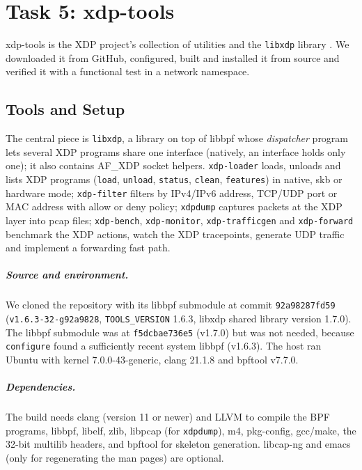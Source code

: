 \chapter{Task 5: xdp-tools}\label{ch:task5}

xdp-tools is the XDP project's collection of utilities and the \texttt{libxdp} library \autocite{xdptools_github}. We downloaded it from GitHub, configured, built and installed it from source and verified it with a functional test in a network namespace.

\section{Tools and Setup}\label{sec:t5-setup}

The central piece is \texttt{libxdp}, a library on top of libbpf whose \emph{dispatcher} program lets several XDP programs share one interface (natively, an interface holds only one); it also contains AF\_XDP socket helpers. \texttt{xdp-loader} loads, unloads and lists XDP programs (\texttt{load}, \texttt{unload}, \texttt{status}, \texttt{clean}, \texttt{features}) in native, skb or hardware mode; \texttt{xdp-filter} filters by IPv4/IPv6 address, TCP/UDP port or MAC address with allow or deny policy; \texttt{xdpdump} captures packets at the XDP layer into pcap files; \texttt{xdp-bench}, \texttt{xdp-monitor}, \texttt{xdp-trafficgen} and \texttt{xdp-forward} benchmark the XDP actions, watch the XDP tracepoints, generate UDP traffic and implement a forwarding fast path.

\paragraph{Source and environment.} We cloned the repository with its libbpf submodule at commit \texttt{92a98287fd59} (\texttt{v1.6.3-32-g92a9828}, \texttt{TOOLS\_VERSION} 1.6.3, libxdp shared library version 1.7.0). The libbpf submodule was at \texttt{f5dcbae736e5} (v1.7.0) but was not needed, because \texttt{configure} found a sufficiently recent system libbpf (v1.6.3). The host ran Ubuntu with kernel 7.0.0-43-generic, clang 21.1.8 and bpftool v7.7.0.

\paragraph{Dependencies.} The build needs clang (version 11 or newer) and LLVM to compile the BPF programs, libbpf, libelf, zlib, libpcap (for \texttt{xdpdump}), m4, pkg-config, gcc/make, the 32-bit multilib headers, and bpftool for skeleton generation. libcap-ng and emacs (only for regenerating the man pages) are optional.

